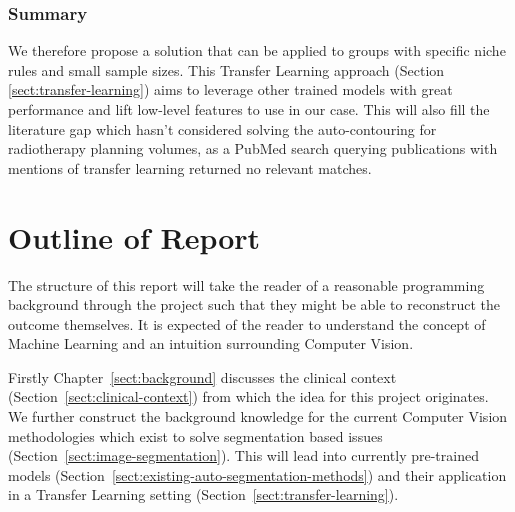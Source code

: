 \documentclass[12pt,twoside]{report}
\begin{document}
\subsubsection{Summary}

We therefore propose a solution that can be applied to groups with specific niche rules and small sample sizes. This Transfer Learning approach (Section \ref{sect:transfer-learning}) aims to leverage other trained models with great performance and lift low-level features to use in our case. This will also fill the literature gap which hasn't considered solving the auto-contouring for radiotherapy planning volumes, as a PubMed search querying publications with mentions of transfer learning returned no relevant matches.

\section{Outline of Report}\label{sect:outline-of-report}

The structure of this report will take the reader of a reasonable programming background through the project such that they might be able to reconstruct the outcome themselves. It is expected of the reader to understand the concept of Machine Learning and an intuition surrounding Computer Vision.

Firstly Chapter~\ref{sect:background} discusses the clinical context (Section~\ref{sect:clinical-context}) from which the idea for this project originates. We further construct the background knowledge for the current Computer Vision methodologies which exist to solve segmentation based issues (Section~\ref{sect:image-segmentation}). This will lead into currently pre-trained models (Section~\ref{sect:existing-auto-segmentation-methods}) and their application in a Transfer Learning setting (Section~\ref{sect:transfer-learning}).


\end{document}
